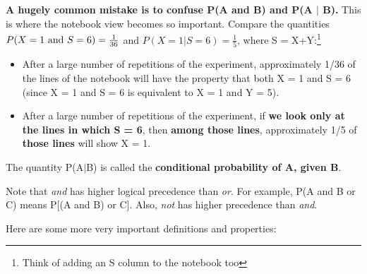 {\bf A hugely common mistake is to confuse P(A and B) and P(A $|$ B).}
This is where the notebook view becomes so important.  Compare the
quantities $P(X = 1 {\rm ~and~} S = 6) = \frac{1}{36}$ and $P(X = 1 | S
= 6) = \frac{1}{5}$, where S = X+Y:\footnote{Think of adding an S column
to the notebook too}

\begin{itemize}

\item After a large number of repetitions of the experiment,
approximately 1/36 of the lines of the notebook will have the property
that both X = 1 and S = 6 (since X = 1 and S = 6 is equivalent to X = 1
and Y = 5).

\item After a large number of repetitions of the experiment, if {\bf we
look only at the lines in which S = 6}, then {\bf among those lines},
approximately 1/5 of {\bf those lines} will show X = 1.

\end{itemize}

The quantity P(A$|$B) is called the {\bf conditional probability of A,
given B}.

Note that {\it and} has higher logical precedence than {\it or}.  For
example, P(A and B or C) means P[(A and B) or C].  Also, {\it not} has
higher precedence than {\it and}.

Here are some more very important definitions and properties:


